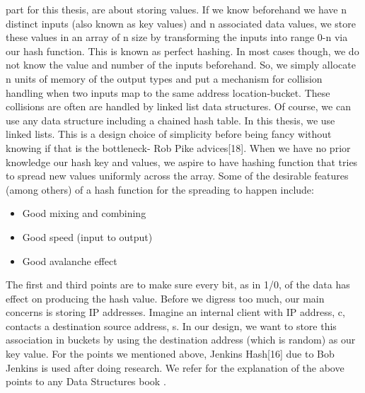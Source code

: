 \documentclass[11pt,left=2cm,bottom=2cm,oneside]{book}
\begin{document}
part for this thesis, are about storing values. If we know beforehand we have
n
distinct inputs (also known as key values) and n associated data values, we
store
these values in an array of n size by transforming the inputs into range 0-n
via our
hash function. This is known as perfect hashing. In most cases though, we do
not
know the value and number of the inputs beforehand. So, we simply allocate n
units
of memory of the output types and put a mechanism for collision handling when
two inputs map to the same address location-bucket. These collisions are often are
handled by linked list data structures. Of course, we can use any data structure
including a chained hash table. In this thesis, we use linked lists. This is a design
choice of simplicity before being fancy without knowing if that is the bottleneck-
Rob Pike advices[18]. When we have no prior knowledge our hash key and values,
we aspire to have hashing function that tries to spread new values uniformly across
the array. Some of the desirable features (among others) of a hash function for the
spreading to happen include:
\begin{itemize}
\item Good mixing and combining
\item Good speed (input to output)
\item Good avalanche effect
\end{itemize}
The first and third points are to make sure every bit, as in 1/0, of the data has
effect on producing the hash value.
Before we digress too much, our main concerns is storing IP addresses. Imagine
an internal client with IP address, c, contacts a destination source address, s. In
our design, we want to store this association in buckets by using the destination
address (which is random) as our key value. For the points we mentioned above,
Jenkins Hash[16] due to Bob Jenkins is used after doing research. We refer for the
explanation of the above points to any Data Structures book .
\end{document}
